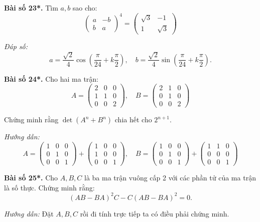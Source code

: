         \textbf{Bài số 23*.} Tìm \(a, b\) sao cho:
        \[
        \begin{pmatrix}
        a & -b \\
        b & a
        \end{pmatrix}^4 = \begin{pmatrix}
        \sqrt{3} & -1 \\
        1 & \sqrt{3}
        \end{pmatrix}
        \]
        
        \textit{Đáp số:}
        \[
        a = \frac{\sqrt{2}}{4} \cos \left( \frac{\pi}{24} + k \frac{\pi}{2} \right), \quad b = \frac{\sqrt{2}}{4} \sin \left( \frac{\pi}{24} + k \frac{\pi}{2} \right).
        \]
        
        \textbf{Bài số 24*.} Cho hai ma trận:
        \[
        A = \begin{pmatrix}
        2 & 0 & 0 \\
        1 & 1 & 0 \\
        0 & 0 & 2
        \end{pmatrix}, \quad B = \begin{pmatrix}
        2 & 1 & 0 \\
        0 & 1 & 0 \\
        0 & 0 & 2
        \end{pmatrix}
        \]
        
        Chứng minh rằng \(\det(A^n + B^n)\) chia hết cho \(2^{n+1}\).
        
        \textit{Hướng dẫn:}
        \[
        A = \begin{pmatrix}
        1 & 0 & 0 \\
        0 & 1 & 0 \\
        0 & 0 & 1
        \end{pmatrix} + \begin{pmatrix}
        1 & 0 & 0 \\
        1 & 0 & 0 \\
        0 & 0 & 1
        \end{pmatrix}, \quad B = \begin{pmatrix}
        1 & 0 & 0 \\
        0 & 1 & 0 \\
        0 & 0 & 1
        \end{pmatrix} + \begin{pmatrix}
        1 & 1 & 0 \\
        0 & 0 & 0 \\
        0 & 0 & 1
        \end{pmatrix}
        \]
        
        \textbf{Bài số 25*.} Cho \(A, B, C\) là ba ma trận vuông cấp 2 với các phần tử của ma trận là số thực. Chứng minh rằng:
        \[
        (AB - BA)^2C - C(AB - BA)^2 = 0.
        \]
        
        \textit{Hướng dẫn:} Đặt \(A, B, C\) rồi đi tính trực tiếp ta có điều phải chứng minh.
    